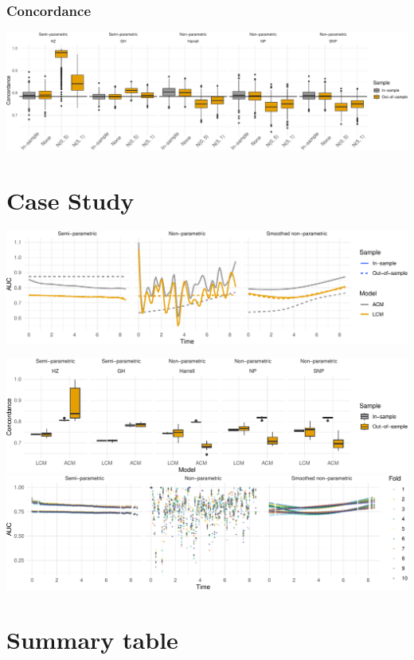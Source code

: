 \documentclass[
]{article}
\begin{document}
\subsubsection{Concordance}\label{concordance-1}

\includegraphics{ProgressReport_files/figure-latex/fig_c_contam-1.pdf}

\section{Case Study}\label{case-study}

\includegraphics{ProgressReport_files/figure-latex/appl_auc-1.pdf}

\includegraphics{ProgressReport_files/figure-latex/appl_c-1.pdf}
\includegraphics{ProgressReport_files/figure-latex/auc_t_scatter-1.pdf}

\section{Summary table}\label{summary-table}
\end{document}
